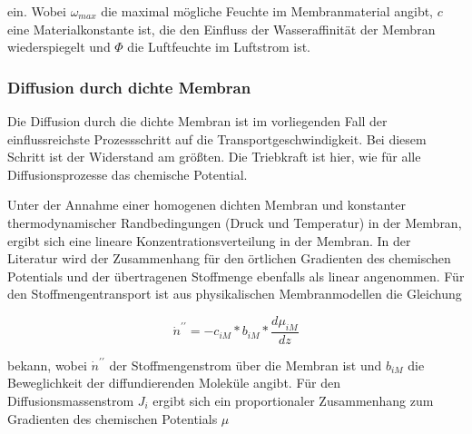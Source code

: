 \begin{normalsize}
\begin{LARGE}
ein. Wobei $\omega_{max}$ die maximal mögliche Feuchte im Membranmaterial angibt, $c$ eine Materialkonstante ist, die den Einfluss der Wasseraffinität der Membran wiederspiegelt und $\Phi$ die Luftfeuchte im Luftstrom ist. 



\subsubsection{Diffusion durch dichte Membran}

Die Diffusion durch die dichte Membran ist im vorliegenden Fall der einflussreichste Prozessschritt auf die Transportgeschwindigkeit. Bei diesem Schritt ist der Widerstand am größten. Die Triebkraft ist hier, wie für alle Diffusionsprozesse das chemische Potential. 


Unter der Annahme einer homogenen dichten Membran und konstanter thermodynamischer Randbedingungen (Druck und Temperatur) in der Membran, ergibt sich eine lineare Konzentrationsverteilung in der Membran. In der Literatur wird der Zusammenhang für den örtlichen Gradienten des chemischen Potentials und der übertragenen Stoffmenge ebenfalls als linear angenommen. 
Für den Stoffmengentransport ist aus physikalischen Membranmodellen die Gleichung 

\begin{equation}
 \dot{n}^{\prime\prime} = - c_{iM} * b_{iM} * \frac{d\mu_{iM}}{dz}
\end{equation}

bekann, wobei $\dot{n}^{\prime\prime}$ der Stoffmengenstrom über die Membran ist und $b_{iM}$ die Beweglichkeit der diffundierenden Moleküle angibt. 
Für den Diffusionsmassenstrom $J_{i}$ ergibt sich ein proportionaler Zusammenhang zum Gradienten des chemischen Potentials $\mu$


\end{LARGE}
\end{normalsize}
